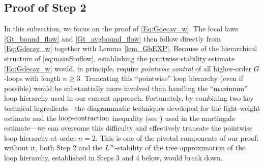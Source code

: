 \begin{lemma}
  
\end{lemma}



 
  





\subsection{Proof of Step 2}\label{subsec:step2_pf}

In this subsection, we focus on the proof of \eqref{Eq:Gdecay_w}. The local laws \eqref{Gt_bound_flow} and \eqref{Gt_avgbound_flow} then follow directly from \eqref{Eq:Gdecay_w} together with Lemma \ref{lem_GbEXP}. 
Because of the hierarchical structure of \eqref{eq:mainStoflow}, establishing the pointwise stability estimate \eqref{Eq:Gdecay_w} would, in principle, require \emph{pointwise control} of all higher-order $G$-loops with length $n \ge 3$. Truncating this ``pointwise'' loop hierarchy (even if possible) would be substantially more involved than handling the ``maximum'' loop hierarchy used in our current approach.
Fortunately, by combining two key technical ingredients---the diagrammatic techniques developed for the light-weight estimate and the $\text{loop-contraction}$ inequality (see ) used in the martingale estimate---we can overcome this difficulty and effectively truncate the pointwise loop hierarchy at order $n=2$. This is one of the pivotal components of our proof: without it, both Step 2 and the $L^\infty$-stability of the tree approximation of the loop hierarchy, established in Steps 3 and 4 below, would break down. 

